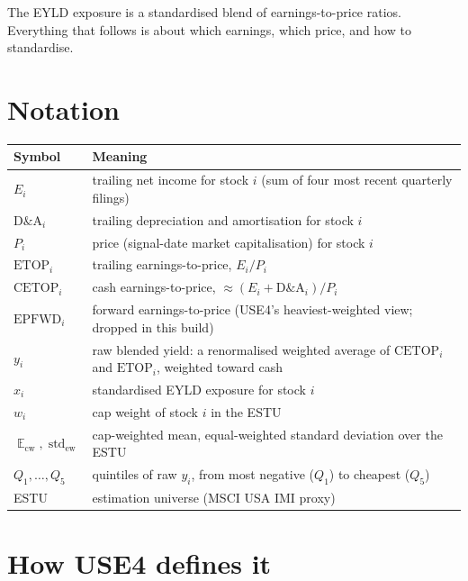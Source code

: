 \documentclass[11pt]{article}
\theoremstyle{definition}
\theoremstyle{plain}
\theoremstyle{remark}
\DeclareMathOperator{\std}{std}
\DeclareMathOperator*{\avg}{\mathbb{E}}
\begin{document}
\begin{keyresult}
The EYLD exposure is a standardised blend of earnings-to-price ratios. Everything that follows is about which earnings, which price, and how to standardise.
\end{keyresult}

\section*{Notation}

\begin{center}
\begin{tabular}{@{}ll@{}}
\toprule
Symbol & Meaning \\
\midrule
$E_i$ & trailing net income for stock $i$ (sum of four most recent quarterly filings) \\
$\text{D\&A}_i$ & trailing depreciation and amortisation for stock $i$ \\
$P_i$ & price (signal-date market capitalisation) for stock $i$ \\
$\text{ETOP}_i$ & trailing earnings-to-price, $E_i / P_i$ \\
$\text{CETOP}_i$ & cash earnings-to-price, $\approx (E_i + \text{D\&A}_i)/P_i$ \\
$\text{EPFWD}_i$ & forward earnings-to-price (USE4's heaviest-weighted view; dropped in this build) \\
$y_i$ & raw blended yield: a renormalised weighted average of $\text{CETOP}_i$ and $\text{ETOP}_i$, weighted toward cash \\
$x_i$ & standardised EYLD exposure for stock $i$ \\
$w_i$ & cap weight of stock $i$ in the ESTU \\
$\avg_{\text{cw}}, \std_{\text{ew}}$ & cap-weighted mean, equal-weighted standard deviation over the ESTU \\
$Q_1,\dots,Q_5$ & quintiles of raw $y_i$, from most negative ($Q_1$) to cheapest ($Q_5$) \\
ESTU & estimation universe (MSCI USA IMI proxy) \\
\bottomrule
\end{tabular}
\end{center}

\section{How USE4 defines it}\label{sec:def}
\end{document}
